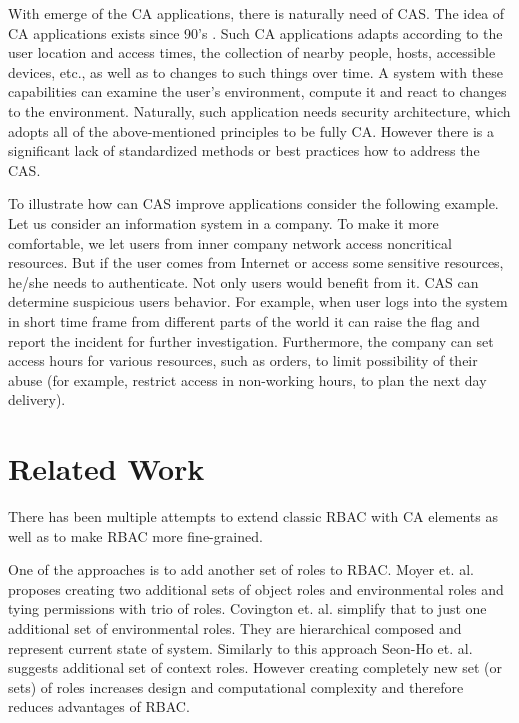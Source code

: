 \documentclass{sig-alternate}
\begin{document}
With emerge of the CA applications, there is naturally need of CAS. The idea of CA applications exists since 90's \cite{contextaware}. Such CA applications adapts according to the user location and access times, the collection of nearby people, hosts, accessible devices, etc., as well as to changes to such things over time. A system with these capabilities can examine the user's environment, compute it and react to changes to the environment. Naturally, such application needs security architecture, which adopts all of the above-mentioned principles to be fully CA. However there is a significant lack of standardized methods or best practices how to address the CAS.

To illustrate how can CAS improve applications consider the following example. Let us consider an information system in a company. To make it more comfortable, we let users from inner company network access noncritical resources. But if the user comes from Internet or access some sensitive resources, he/she needs to authenticate. Not only users would benefit from it. CAS can determine suspicious users behavior. For example, when user logs into the system in short time frame from different parts of the world it can raise the flag and report the incident for further investigation. Furthermore, the company can set access hours for various resources, such as orders, to limit possibility of their abuse (for example, restrict access in non-working hours, to plan the next day delivery).

\section{Related Work}
There has been multiple attempts to extend classic RBAC with CA elements as well as to make RBAC more fine-grained.

One of the approaches is to add another set of roles to RBAC. Moyer et. al. \cite{grbac} proposes creating two additional sets of object roles and environmental roles and tying permissions with trio of roles. Covington et. al. \cite{envroles} simplify that to just one additional set of environmental roles. They are hierarchical composed and represent current state of system. Similarly to this approach Seon-Ho et. al. \cite{contextroles} suggests additional set of context roles. However creating completely new set (or sets) of roles increases design and computational complexity and therefore reduces advantages of RBAC.
\end{document}
